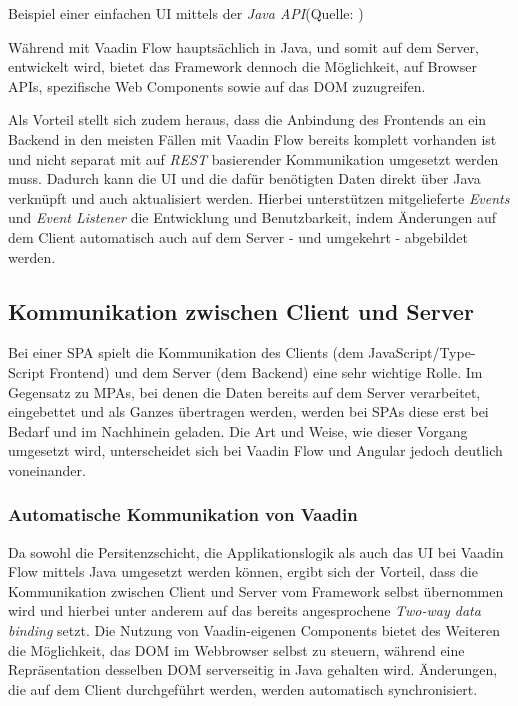 \documentclass[a4paper,12pt,twoside]{scrreprt}
\begin{document}
\begin{listing}[ht]
    \inputminted[fontsize=\footnotesize,linenos]{java}{code/Vaadin_Java-UI-sample.java}
    \caption[Beispiel einer einfachen \acs{UI} mittels der \textit{Java API}]{Beispiel einer einfachen \acs{UI} mittels der \textit{Java API}\newline(Quelle: \cite[][]{vaadin_ltd_overview_2021})}
    \label{code:vaadin-ui-java-sample}
\end{listing}

Während mit Vaadin Flow hauptsächlich in Java, und somit auf dem Server, entwickelt wird, bietet das Framework dennoch die Möglichkeit, auf Browser \acsp{API}, spezifische Web Components sowie auf das \ac{DOM} zuzugreifen.

Als Vorteil stellt sich zudem heraus, dass die Anbindung des Frontends an ein Backend in den meisten Fällen mit Vaadin Flow bereits komplett vorhanden ist und nicht separat mit auf \textit{REST} basierender Kommunikation umgesetzt werden muss. Dadurch kann die \acs{UI} und die dafür benötigten Daten direkt über Java verknüpft und auch aktualisiert werden. Hierbei unterstützen mitgelieferte \textit{Events} und \textit{Event Listener} die Entwicklung und Benutzbarkeit, indem Änderungen auf dem Client automatisch auch auf dem Server - und umgekehrt - abgebildet werden. \parencite[][]{vaadin_ltd_overview_2021-2}

\subsection{Kommunikation zwischen Client und Server}
\label{sub-sec:kommunikation-client-server}
Bei einer \ac{SPA} spielt die Kommunikation des Clients (dem JavaScript/Type-Script Frontend) und dem Server (dem Backend) eine sehr wichtige Rolle. Im Gegensatz zu \acp{MPA}, bei denen die Daten bereits auf dem Server verarbeitet, eingebettet und als Ganzes übertragen werden, werden bei \acsp{SPA} diese erst bei Bedarf und im Nachhinein geladen. Die Art und Weise, wie dieser Vorgang umgesetzt wird, unterscheidet sich bei Vaadin Flow und Angular jedoch deutlich voneinander.

\subsubsection{Automatische Kommunikation von Vaadin}
\label{sub-sub-sec:kommunikation-herangehensweise-vaadin}
Da sowohl die Persitenzschicht, die Applikationslogik als auch das \acl{UI} bei Vaadin Flow mittels Java umgesetzt werden können, ergibt sich der Vorteil, dass die Kommunikation zwischen Client und Server vom Framework selbst übernommen wird und hierbei unter anderem auf das bereits angesprochene \textit{Two-way data binding} setzt. Die Nutzung von Vaadin-eigenen Components bietet des Weiteren die Möglichkeit, das \ac{DOM} im Webbrowser selbst zu steuern, während eine Repräsentation desselben \ac{DOM} serverseitig in Java gehalten wird. Änderungen, die auf dem Client durchgeführt werden, werden automatisch synchronisiert. \parencite[][Framework - Introduction - Core Concepts]{vaadin_ltd_documentation_nodate}
\end{document}
